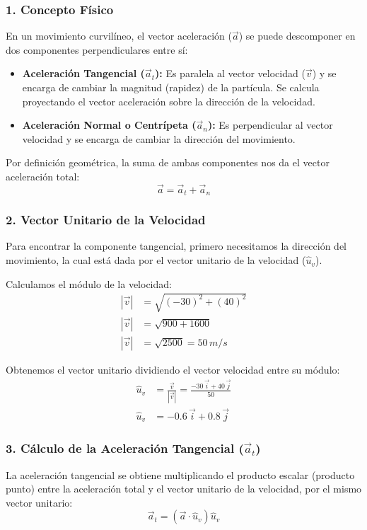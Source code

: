 \documentclass[12pt, a4paper]{article}
\begin{document}
\subsubsection*{1. Concepto Físico}
En un movimiento curvilíneo, el vector aceleración ($\vec{a}$) se puede descomponer en dos componentes perpendiculares entre sí:
\begin{itemize}
    \item \textbf{Aceleración Tangencial ($\vec{a}_t$):} Es paralela al vector velocidad ($\vec{v}$) y se encarga de cambiar la magnitud (rapidez) de la partícula. Se calcula proyectando el vector aceleración sobre la dirección de la velocidad.
    \item \textbf{Aceleración Normal o Centrípeta ($\vec{a}_n$):} Es perpendicular al vector velocidad y se encarga de cambiar la dirección del movimiento.
\end{itemize}

Por definición geométrica, la suma de ambas componentes nos da el vector aceleración total:
$$ \vec{a} = \vec{a}_t + \vec{a}_n $$

\subsubsection*{2. Vector Unitario de la Velocidad}
Para encontrar la componente tangencial, primero necesitamos la dirección del movimiento, la cual está dada por el vector unitario de la velocidad ($\hat{u}_v$).

Calculamos el módulo de la velocidad:
\begin{align*}
    |\vec{v}| &= \sqrt{(-30)^2 + (40)^2} \\
    |\vec{v}| &= \sqrt{900 + 1600} \\
    |\vec{v}| &= \sqrt{2500} = 50 \, \si{m/s}
\end{align*}

Obtenemos el vector unitario dividiendo el vector velocidad entre su módulo:
\begin{align*}
    \hat{u}_v &= \frac{\vec{v}}{|\vec{v}|} = \frac{-30 \, \vec{i} + 40 \, \vec{j}}{50} \\
    \hat{u}_v &= -0.6 \, \vec{i} + 0.8 \, \vec{j}
\end{align*}

\subsubsection*{3. Cálculo de la Aceleración Tangencial ($\vec{a}_t$)}
La aceleración tangencial se obtiene multiplicando el producto escalar (producto punto) entre la aceleración total y el vector unitario de la velocidad, por el mismo vector unitario:
$$ \vec{a}_t = (\vec{a} \cdot \hat{u}_v) \hat{u}_v $$
\end{document}
